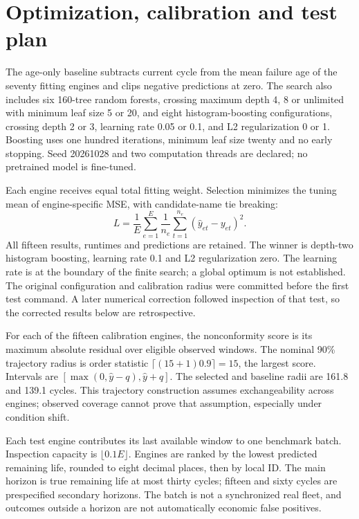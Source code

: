 \documentclass[11pt]{article}
\begin{document}
\section{Optimization, calibration and test plan}
The age-only baseline subtracts current cycle from the mean failure age of the seventy fitting engines and clips negative predictions at zero. The search also includes six 160-tree random forests, crossing maximum depth 4, 8 or unlimited with minimum leaf size 5 or 20, and eight histogram-boosting configurations, crossing depth 2 or 3, learning rate 0.05 or 0.1, and L2 regularization 0 or 1. Boosting uses one hundred iterations, minimum leaf size twenty and no early stopping. Seed 20261028 and two computation threads are declared; no pretrained model is fine-tuned.

Each engine receives equal total fitting weight. Selection minimizes the tuning mean of engine-specific MSE, with candidate-name tie breaking:
\[
 L=\frac{1}{E}\sum_{e=1}^{E}\frac{1}{n_e}\sum_{t=1}^{n_e}(\widehat y_{et}-y_{et})^2.
\]
All fifteen results, runtimes and predictions are retained. The winner is depth-two histogram boosting, learning rate 0.1 and L2 regularization zero. The learning rate is at the boundary of the finite search; a global optimum is not established. The original configuration and calibration radius were committed before the first test command. A later numerical correction followed inspection of that test, so the corrected results below are retrospective.

For each of the fifteen calibration engines, the nonconformity score is its maximum absolute residual over eligible observed windows. The nominal 90\% trajectory radius is order statistic $\lceil(15+1)0.9\rceil=15$, the largest score. Intervals are $[\max(0,\widehat y-q),\widehat y+q]$. The selected and baseline radii are 161.8 and 139.1 cycles. This trajectory construction assumes exchangeability across engines; observed coverage cannot prove that assumption, especially under condition shift.

Each test engine contributes its last available window to one benchmark batch. Inspection capacity is $\lfloor0.1E\rfloor$. Engines are ranked by the lowest predicted remaining life, rounded to eight decimal places, then by local ID. The main horizon is true remaining life at most thirty cycles; fifteen and sixty cycles are prespecified secondary horizons. The batch is not a synchronized real fleet, and outcomes outside a horizon are not automatically economic false positives.
\end{document}
